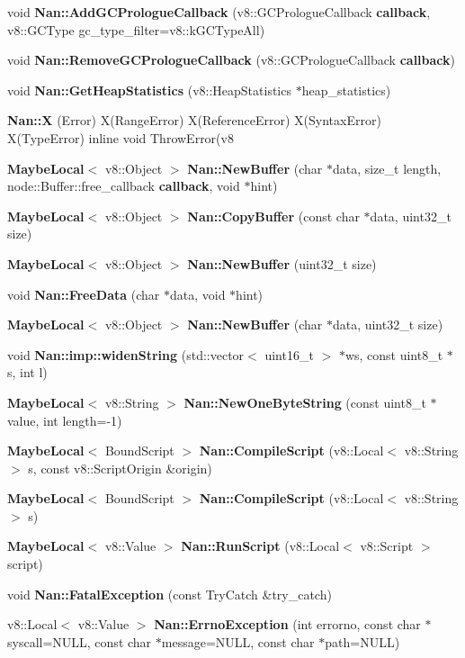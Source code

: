\begin{DoxyCompactItemize}
\item 
void \textbf{ Nan\+::\+Add\+G\+C\+Prologue\+Callback} (v8\+::\+G\+C\+Prologue\+Callback \textbf{ callback}, v8\+::\+G\+C\+Type gc\+\_\+type\+\_\+filter=v8\+::k\+G\+C\+Type\+All)
\item 
void \textbf{ Nan\+::\+Remove\+G\+C\+Prologue\+Callback} (v8\+::\+G\+C\+Prologue\+Callback \textbf{ callback})
\item 
void \textbf{ Nan\+::\+Get\+Heap\+Statistics} (v8\+::\+Heap\+Statistics $\ast$heap\+\_\+statistics)
\item 
\textbf{ Nan\+::X} (Error) X(Range\+Error) X(Reference\+Error) X(Syntax\+Error) X(Type\+Error) inline void Throw\+Error(v8
\item 
\textbf{ Maybe\+Local}$<$ v8\+::\+Object $>$ \textbf{ Nan\+::\+New\+Buffer} (char $\ast$data, size\+\_\+t length, node\+::\+Buffer\+::free\+\_\+callback \textbf{ callback}, void $\ast$hint)
\item 
\textbf{ Maybe\+Local}$<$ v8\+::\+Object $>$ \textbf{ Nan\+::\+Copy\+Buffer} (const char $\ast$data, uint32\+\_\+t size)
\item 
\textbf{ Maybe\+Local}$<$ v8\+::\+Object $>$ \textbf{ Nan\+::\+New\+Buffer} (uint32\+\_\+t size)
\item 
void \textbf{ Nan\+::\+Free\+Data} (char $\ast$data, void $\ast$hint)
\item 
\textbf{ Maybe\+Local}$<$ v8\+::\+Object $>$ \textbf{ Nan\+::\+New\+Buffer} (char $\ast$data, uint32\+\_\+t size)
\item 
void \textbf{ Nan\+::imp\+::widen\+String} (std\+::vector$<$ uint16\+\_\+t $>$ $\ast$ws, const uint8\+\_\+t $\ast$s, int l)
\item 
\textbf{ Maybe\+Local}$<$ v8\+::\+String $>$ \textbf{ Nan\+::\+New\+One\+Byte\+String} (const uint8\+\_\+t $\ast$value, int length=-\/1)
\item 
\textbf{ Maybe\+Local}$<$ Bound\+Script $>$ \textbf{ Nan\+::\+Compile\+Script} (v8\+::\+Local$<$ v8\+::\+String $>$ s, const v8\+::\+Script\+Origin \&origin)
\item 
\textbf{ Maybe\+Local}$<$ Bound\+Script $>$ \textbf{ Nan\+::\+Compile\+Script} (v8\+::\+Local$<$ v8\+::\+String $>$ s)
\item 
\textbf{ Maybe\+Local}$<$ v8\+::\+Value $>$ \textbf{ Nan\+::\+Run\+Script} (v8\+::\+Local$<$ v8\+::\+Script $>$ script)
\item 
void \textbf{ Nan\+::\+Fatal\+Exception} (const Try\+Catch \&try\+\_\+catch)
\item 
v8\+::\+Local$<$ v8\+::\+Value $>$ \textbf{ Nan\+::\+Errno\+Exception} (int errorno, const char $\ast$syscall=N\+U\+LL, const char $\ast$message=N\+U\+LL, const char $\ast$path=N\+U\+LL)

\end{DoxyCompactItemize}
